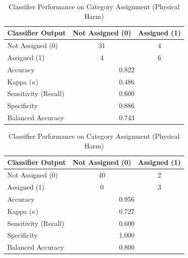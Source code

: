 \begin{table}[h!]
\begin{minipage}{0.48\textwidth}
\centering
\caption{Classifier Performance on Category Assignment (Socioeconomic Harm)}
\label{tab:cm-socioec-harm}
\begin{tabular}{lcc}
\hline
\textbf{Classifier Output} & \textbf{Not Assigned (0)} & \textbf{Assigned (1)} \\
\hline
Not Assigned (0) & 31 & 4 \\
Assigned (1) & 4 & 6 \\
\hline
Accuracy & \multicolumn{2}{c}{0.822} \\
Kappa ($\kappa$) & \multicolumn{2}{c}{0.486} \\
Sensitivity (Recall) & \multicolumn{2}{c}{0.600} \\
Specificity & \multicolumn{2}{c}{0.886} \\
Balanced Accuracy & \multicolumn{2}{c}{0.743} \\
\hline
\end{tabular}
\end{minipage}
\hfill
\hfill
\begin{minipage}{0.48\textwidth}
\centering
\caption{Classifier Performance on Category Assignment (Physical Harm)}
\label{tab:cm-physical-harm}
\begin{tabular}{lcc}
\hline
\textbf{Classifier Output} & \textbf{Not Assigned (0)} & \textbf{Assigned (1)} \\
\hline
Not Assigned (0) & 40 & 2 \\
Assigned (1) & 0 & 3 \\
\hline
Accuracy & \multicolumn{2}{c}{0.956} \\
Kappa ($\kappa$) & \multicolumn{2}{c}{0.727} \\
Sensitivity (Recall) & \multicolumn{2}{c}{0.600} \\
Specificity & \multicolumn{2}{c}{1.000} \\
Balanced Accuracy & \multicolumn{2}{c}{0.800} \\
\hline
\end{tabular}
\end{minipage}
\end{table}

